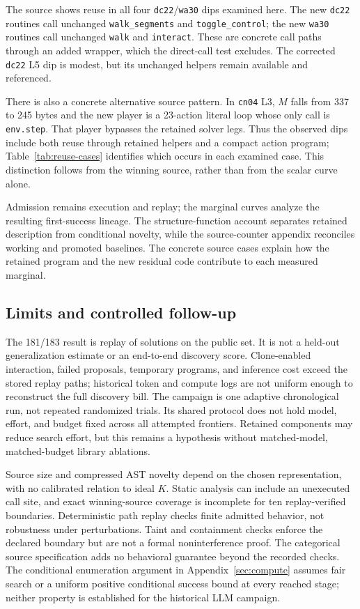\documentclass[11pt]{article}
\theoremstyle{definition}
\theoremstyle{remark}
\begin{document}
The source shows reuse in all four \texttt{dc22}/\texttt{wa30} dips examined here.
The new \texttt{dc22} routines call unchanged \texttt{walk\_segments} and
\texttt{toggle\_control}; the new \texttt{wa30} routines call unchanged \texttt{walk}
and \texttt{interact}. These are concrete call paths through an added wrapper,
which the direct-call test excludes. The corrected \texttt{dc22} L5 dip is modest,
but its unchanged helpers remain available and referenced.

There is also a concrete alternative source pattern. In \texttt{cn04} L3,
$M$ falls from 337 to 245 bytes and the new player is a 23-action literal loop
whose only call is \texttt{env.step}. That player bypasses the retained solver
legs. Thus the observed dips include both reuse through retained helpers and a
compact action program; Table~\ref{tab:reuse-cases} identifies which occurs in
each examined case. This distinction follows from the winning source, rather
than from the scalar curve alone.

Admission remains execution and replay; the marginal curves analyze the resulting
first-success lineage. The structure-function account separates retained description
from conditional novelty, while the source-counter appendix reconciles working and
promoted baselines. The concrete source cases explain how the retained program
and the new residual code contribute to each measured marginal.

\subsection{Limits and controlled follow-up}
The 181/183 result is replay of solutions on the public set. It is not a held-out
generalization estimate or an end-to-end discovery score. Clone-enabled interaction,
failed proposals, temporary programs, and inference cost exceed the stored replay
paths; historical token and compute logs are not uniform enough to reconstruct the
full discovery bill. The campaign is one adaptive chronological run, not repeated
randomized trials. Its shared protocol does not hold model, effort, and budget fixed
across all attempted frontiers. Retained components may reduce search effort, but
this remains a hypothesis without matched-model, matched-budget library ablations.

Source size and compressed AST novelty depend on the chosen representation, with
no calibrated relation to ideal $K$. Static analysis can include an unexecuted call
site, and exact winning-source coverage is incomplete for ten replay-verified
boundaries. Deterministic path replay checks finite admitted behavior, not robustness
under perturbations. Taint and containment checks enforce the declared boundary but
are not a formal noninterference proof. The categorical source specification adds no
behavioral guarantee beyond the recorded checks. The conditional enumeration argument
in Appendix~\ref{sec:compute} assumes fair search or a uniform positive conditional
success bound at every reached stage; neither property is established for the
historical LLM campaign.
\end{document}
